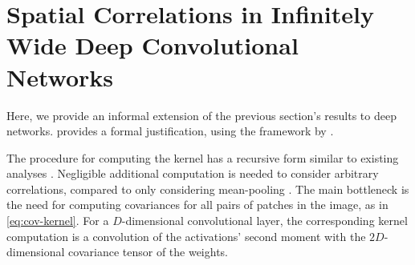 \documentclass[accepted]{uai2021} %
\newcommand{\0}{\boldsymbol{0}}
\newcommand{\1}{\boldsymbol{1}}
\begin{document}




\section{Spatial Correlations in Infinitely Wide Deep Convolutional Networks}
\label{sec:deep-correlations}
Here, we provide an informal extension of the previous section's results to deep networks.  provides a formal justification, using the framework by \citet{yang2019wide}.

The procedure for computing the kernel has a recursive form similar to existing analyses \citep{garriga2018infiniteconv,novak2019infiniteconv}. Negligible additional computation is needed to consider arbitrary correlations, compared to only considering mean-pooling \citep{novak2019infiniteconv,arora2019exact}. The main bottleneck is the need for computing covariances for all pairs of patches in the image, as in \cref{eq:cov-kernel}. For a $D$-dimensional convolutional layer, the corresponding kernel computation is a convolution of the activations' second moment with the
$2D$-dimensional covariance tensor of the weights.
\end{document}
